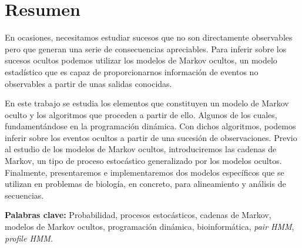 \chapter*{Resumen}
En ocasiones, necesitamos estudiar sucesos que no son directamente observables pero que generan una serie de consecuencias apreciables. Para inferir sobre los sucesos ocultos podemos utilizar los modelos de Markov ocultos, un modelo estadístico que es capaz de proporcionarnos información de eventos no observables a partir de unas salidas conocidas. 

En este trabajo se estudia los elementos que constituyen un modelo de Markov oculto y los algoritmos que proceden a partir de ello. Algunos de los cuales, fundamentándose en la  programación dinámica. Con dichos algoritmos, podemos inferir sobre los eventos ocultos a partir de una sucesión de observaciones. Previo al estudio de los modelos de Markov ocultos, introduciremos las cadenas de Markov, un tipo de proceso estocástico generalizado por los modelos ocultos. Finalmente, presentaremos e implementaremos dos modelos específicos que se utilizan en problemas de biología, en concreto, para alineamiento y análisis de secuencias.

\textbf{Palabras clave: } Probabilidad, procesos estocásticos, cadenas de Markov, modelos de Markov ocultos, programación dinámica, bioinformática, \textit{pair HMM}, \textit{profile HMM}.
